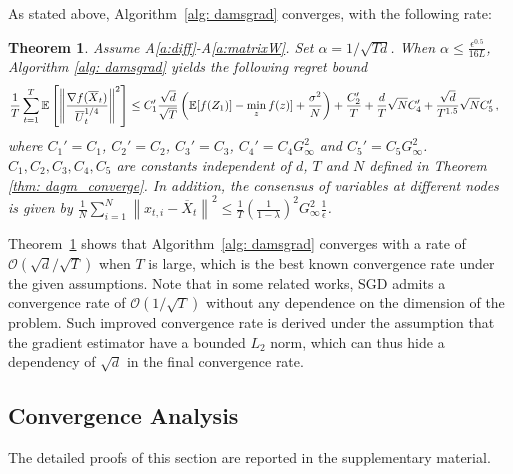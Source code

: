 \documentclass{article} %
\newtheorem{theorem}{Theorem}
\begin{document}
As stated above, Algorithm~\ref{alg: damsgrad} converges, with the following rate:
\begin{theorem}\label{thm: dams_converge}
Assume A\ref{a:diff}-A\ref{a:matrixW}.
Set $\alpha = 1/\sqrt{Td}$. When $\alpha  \leq \frac{\epsilon^{0.5}}{16L} $, Algorithm \ref{alg: damsgrad} yields the following regret bound
	  \begin{align}\notag
	  & \frac{1}{T}\sum_{t=1}^T  \mathbb E \left [\left\|\frac{\nabla f( \overline X_{t})}{\overline U_{t}^{1/4}}\right\|^2  \right] 
	  \leq    C_1' \frac{\sqrt{d}}{\sqrt{T}} \left(\mathbb E  [f( Z_{1})]  - \min_{z} f(z)]  + \frac{\sigma^2}{N}\right)  +  \frac{ C_2'}{T}    +   \frac{d}{T }\sqrt{N} C_4' + \frac{\sqrt{d}}{T^{1.5} } \sqrt{N} C_5'\, ,
	  \end{align}
	where $C_1' = C_1$, $C_2' = C_2$, $C_3' = C_3$, $C_4' = C_4G_{\infty}^2$ and $C_5' = C_5 G_{\infty}^2 $. $C_1,C_2, C_3, C_4, C_5$ are constants independent of $d$, $T$ and $N$ defined in Theorem \ref{thm: dagm_converge}. In addition, the consensus of variables at different nodes is given by $\frac{1}{N}\sum_{i=1}^N\left\| {  x_{t,i} -   \overline X_{t}}  \right\|^2   \leq \frac{1}{T} \left (\frac{1}{1-\lambda} \right)^2  G_{\infty}^2 \frac{1}{\epsilon}$. 
\end{theorem}

Theorem~\ref{thm: dams_converge} shows that Algorithm~\ref{alg: damsgrad} converges with a rate of  $\mathcal{O}(\sqrt{d}/\sqrt{T})$ when $T$ is large, which is the best known convergence rate under the given assumptions. 
Note that in some related works, SGD admits a convergence rate of $\mathcal{O}(1/\sqrt{T})$ without any dependence on the dimension of the problem.
Such improved convergence rate is derived under the assumption that the gradient estimator have a bounded $L_2$ norm, which can thus hide a dependency of $\sqrt{d}$ in the final convergence rate. 


\vspace{-0.05in}
\subsection{Convergence Analysis}
\vspace{-0.05in}

The detailed proofs of this section are reported in the supplementary material.
\end{document}
